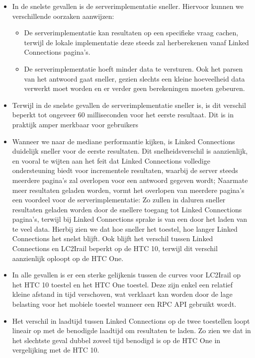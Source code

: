 \begin{itemize}
\item In de snelste gevallen is de serverimplementatie sneller. Hiervoor kunnen we verschillende oorzaken aanwijzen: 
	\begin{itemize}
		\item De serverimplementatie kan resultaten op een specifieke vraag cachen, terwijl de lokale implementatie deze steeds zal herberekenen vanaf Linked Connections pagina's.
		\item De serverimplementatie hoeft minder data te versturen. Ook het parsen van het antwoord gaat sneller, gezien slechts een kleine hoeveelheid data verwerkt moet worden en er verder geen berekeningen moeten gebeuren.
	\end{itemize}
	\item Terwijl in de snelste gevallen de serverimplementatie sneller is, is dit verschil beperkt tot ongeveer 60 milliseconden voor het eerste resultaat. Dit is in praktijk amper merkbaar voor gebruikers %
	\item Wanneer we naar de mediane performantie kijken, is Linked Connections duidelijk sneller voor de eerste resultaten. Dit snelheidsverschil is aanzienlijk, en vooral te wijten aan het feit dat Linked Connections volledige ondersteuning biedt voor incrementele resultaten, waarbij de server steeds meerdere pagina's zal overlopen voor een antwoord gegeven wordt; Naarmate meer resultaten geladen worden, vormt het overlopen van meerdere pagina's een voordeel voor de serverimplementatie: Zo zullen in daluren sneller resultaten geladen worden door de snellere toegang tot Linked Connections pagina's, terwijl bij Linked Connections sprake is van een  door het laden van te veel data. Hierbij zien we dat hoe sneller het toestel, hoe langer Linked Connections het snelst blijft. Ook blijft het verschil tussen Linked Connections en LC2Irail beperkt op de HTC 10, terwijl dit verschil aanzienlijk oploopt op de HTC One.
	\item In alle gevallen is er een sterke gelijkenis tussen de curves voor LC2Irail op het HTC 10 toestel en het HTC One toestel. Deze zijn enkel een relatief kleine afstand in tijd verschoven, wat verklaart kan worden door de lage belasting voor het mobiele toestel wanneer een RPC API gebruikt wordt.
	\item Het verschil in laadtijd tussen Linked Connections op de twee toestellen loopt lineair op met de benodigde laadtijd om resultaten te laden. Zo zien we dat in het slechtste geval dubbel zoveel tijd benodigd is op de HTC One in vergelijking met de HTC 10.
\end{itemize}

